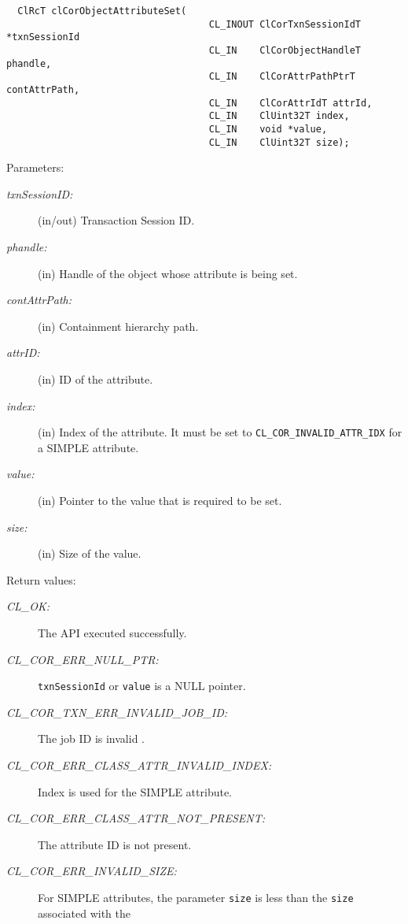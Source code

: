 \begin{flushleft}
\begin{Desc}
\footnotesize\begin{verbatim}  ClRcT clCorObjectAttributeSet(
                                  	CL_INOUT ClCorTxnSessionIdT *txnSessionId
                                  	CL_IN    ClCorObjectHandleT phandle,
                                  	CL_IN    ClCorAttrPathPtrT contAttrPath,
                                  	CL_IN    ClCorAttrIdT attrId,
                                  	CL_IN    ClUint32T index,
                                  	CL_IN    void *value,
                                  	CL_IN    ClUint32T size);
\end{verbatim}
\normalsize
\end{Desc}
\begin{Desc}
\item[Parameters:]
\begin{description}
\item[{\em txn\-Session\-ID:}](in/out) Transaction Session ID. 
\item[{\em p\-handle:}](in) Handle of the object whose attribute is being set. 
\item[{\em cont\-Attr\-Path:}](in) Containment hierarchy path. 
\item[{\em attr\-ID:}](in) ID of the attribute. 
\item[{\em index:}](in) Index of the attribute. It must be set to {\tt{CL\_\-COR\_\-INVALID\_\-ATTR\_\-IDX}} for a SIMPLE attribute.
\item[{\em value:}](in) Pointer to the value that is required to be set. 
\item[{\em size:}](in) Size of the value.\end{description}
\end{Desc}
\begin{Desc}
\item[Return values:]
\begin{description}
\item[{\em CL\_\-OK:}]The API executed successfully. 
\item[{\em CL\_\-COR\_\-ERR\_\-NULL\_\-PTR:}]{\tt{txnSessionId}} or {\tt{value}} is a NULL pointer. 
\item[{\em CL\_\-COR\_\-TXN\_\-ERR\_\-INVALID\_\-JOB\_\-ID:}] The job ID is invalid . 
\item[{\em CL\_\-COR\_\-ERR\_\-CLASS\_\-ATTR\_\-INVALID\_\-INDEX:}] Index is used for the SIMPLE attribute. 
\item[{\em CL\_\-COR\_\-ERR\_\-CLASS\_\-ATTR\_\-NOT\_\-PRESENT:}]The attribute ID is not present.
\item[{\em CL\_\-COR\_\-ERR\_\-INVALID\_\-SIZE:}] For SIMPLE attributes, the parameter {\tt{size}} is less than the {\tt{size}} associated with the 

\end{description}
\end{Desc}
\end{flushleft}

